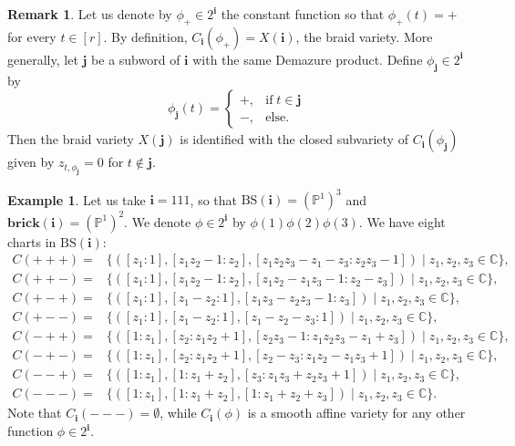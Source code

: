 \documentclass[a4paper, 11pt]{amsart}
\newcommand{\brick}{\mathbf{brick}}
\newcommand{\PP}{\mathbb{P}}
\newcommand{\word}[1]{\mathbf{#1}}
\newcommand{\C}{\mathbb{C}}
\newcommand{\BS}{\mathrm{BS}}
\theoremstyle{definition}
\newtheorem{remark}[theorem]{Remark}
\newtheorem{example}[theorem]{Example}
\begin{document}
\begin{remark}\label{rmk:equations-braid}
    Let us denote by $\phi_{+} \in 2^{\word{i}}$ the constant function so that $\phi_{+}(t) = +$ for every $t \in [r]$. By definition, $C_{\word{i}}(\phi_{+}) = X(\word{i})$, the braid variety. More generally, let $\word{j}$ be a subword of $\word{i}$ with the same Demazure product. Define $\phi_{\word{j}} \in 2^{\word{i}}$ by
    \[
    \phi_{\word{j}}(t) = \begin{cases} +, & \text{if} \; t \in \word{j} \\ -, & \text{else}. \end{cases}
    \]
    Then the braid variety $X(\word{j})$ is identified with the closed subvariety of $C_{\word{i}}(\phi_{\word{j}})$ given by $z_{t, \phi_{\word{j}}} = 0$ for $t \not \in \word{j}$. 
\end{remark}

\begin{example}\label{ex:running-1}
Let us take $\word{i} = 111$, so that $\BS(\word{i}) = (\PP^1)^3$ and $\brick(\word{i}) = (\PP^1)^2$. We denote $\phi \in 2^{\word{i}}$ by $\phi(1)\phi(2)\phi(3)$. We have eight charts in $\BS(\word{i})$:
\[
\begin{array}{rl}
C(+++) = & \{([z_{1}:1], [z_1z_2-1:z_2], [z_1z_2z_3-z_1-z_3: z_2z_3-1]) \mid z_1, z_2, z_3 \in \C\},  \\
C(++-) = & \{([z_{1}:1], [z_1z_2-1:z_2], [{z_1z_2-z_1z_3-1}: z_2-z_3]) \mid z_1, z_2, z_3 \in \C\}, \\
C(+-+) = & \{([z_1:1], [z_1-z_2:1], [z_1z_3-z_2z_3-1:z_3]) \mid z_1, z_2, z_3 \in \C\}, \\
C(+--) = & \{([z_1:1], [z_1-z_2:1], [z_1-z_2-z_3:1]) \mid z_1, z_2, z_3 \in \C\}, \\
C(-++) = & \{([1:z_1], [z_2:z_1z_2+1], [z_2z_3-1:z_1z_2z_3 - z_1 + z_3]) \mid z_1, z_2, z_3 \in \C\}, \\
C(-+-) = & \{([1:z_1], [z_2:z_1z_2+1], [z_2-z_3:z_1z_2-z_1z_3+1]) \mid z_1, z_2, z_3 \in \C\}, \\
C(--+) = & \{([1:z_1], [1:z_1+z_2], [z_3: z_1z_3 + z_2z_3+1]) \mid z_1, z_2, z_3 \in \C\}, \\
C(---) = & \{([1:z_1], [1:z_1+z_2], [1:z_1+z_2+z_3]) \mid z_1, z_2, z_3 \in \C\}. 
\end{array}
\]
Note that $C_{\word{i}}(---) = \emptyset$, while $C_{\word{i}}(\phi)$ is a smooth affine variety for any other function $\phi \in 2^{\word{i}}$. 
\end{example}
\end{document}
